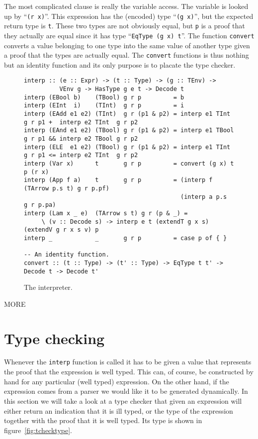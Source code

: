 \documentclass{llncs}[12pt]             %
\newcommand\tmp[1]{{\sf #1}}
\newcommand{\te}[1]{{\tt #1}}
\begin{document}
The most complicated clause is really the variable access.
The variable is looked up by ``\te{(r x)}''.  This expression has
the (encoded) type ``\te{(g x)}'', but the expected return type is \te{t}.
These two types are not obviously equal, but \te{p} is a proof
that they actually are equal since it has type ``\te{EqType (g x) t}''.
The function \te{convert} converts a value belonging to one
type into the same value of another type given a proof that
the types are actually equal.  The \te{convert} functions
is thus nothing but an identity function and its only purpose
is to placate the type checker.

\begin{figure}
{\small
\begin{verbatim}
interp :: (e :: Expr) -> (t :: Type) -> (g :: TEnv) -> 
          VEnv g -> HasType g e t -> Decode t
interp (EBool b)    (TBool) g r p         = b
interp (EInt  i)    (TInt)  g r p         = i
interp (EAdd e1 e2) (TInt)  g r (p1 & p2) = interp e1 TInt  g r p1 +  interp e2 TInt  g r p2
interp (EAnd e1 e2) (TBool) g r (p1 & p2) = interp e1 TBool g r p1 && interp e2 TBool g r p2
interp (ELE  e1 e2) (TBool) g r (p1 & p2) = interp e1 TInt  g r p1 <= interp e2 TInt  g r p2
interp (Var x)      t       g r p         = convert (g x) t p (r x)
interp (App f a)    t       g r p         = (interp f (TArrow p.s t) g r p.pf) 
                                            (interp a p.s            g r p.pa)
interp (Lam x _ e)  (TArrow s t) g r (p & _) = 
     \ (v :: Decode s) -> interp e t (extendT g x s) (extendV g r x s v) p
interp _            _       g r p         = case p of { }

-- An identity function.
convert :: (t :: Type) -> (t' :: Type) -> EqType t t' -> Decode t -> Decode t'
\end{verbatim}
}
\caption{The interpreter.}
\label{fig:interp}
\end{figure}

\tmp{MORE}

\section{Type checking}
Whenever the \te{interp} function is called it has to be given
a value that represents the proof that the expression is well typed.
This can, of course, be constructed by hand for any particular
(well typed) expression.  On the other hand, if the expression comes
from a parser we would like it to be generated dynamically.
In this section we will take a look at a type checker that given
an expression will either return an indication that it is ill typed,
or the type of the expression together with the proof that it is
well typed.  Its type is shown in figure~\ref{fig:tchecktype}.
\end{document}
